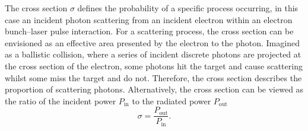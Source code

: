 \documentclass[../main.tex]{subfiles}
\begin{document}
The cross section $\sigma$ defines the probability of a specific process occurring, in this case an incident photon scattering from an incident electron within an electron bunch--laser pulse interaction. For a scattering process, the cross section can be envisioned as an effective area presented by the electron to the photon. Imagined as a ballistic collision, where a series of incident discrete photons are projected at the cross section of the electron, some photons hit the target and cause scattering whilst some miss the target and do not. Therefore, the cross section describes the proportion of scattering photons. Alternatively, the cross section can be viewed as the ratio of the incident power $P_{\mathrm{in}}$ to the radiated power $P_{\mathrm{out}}$
\begin{equation}
\sigma = \frac{P_{\mathrm{out}}}{P_{\mathrm{in}}}.
\label{eq:cross_section_power}
\end{equation}
\end{document}
